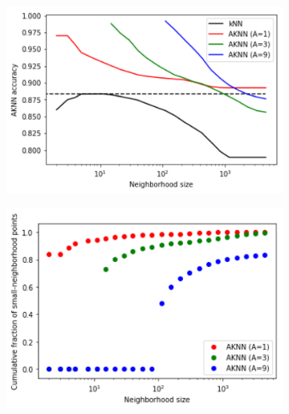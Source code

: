 \documentclass{article}
\begin{document}
\begin{figure}
    \begin{subfigure}[t]{0.49\textwidth}
    \centering
        \includegraphics[width=\linewidth]{figs/notMNIST/notMNIST_aknnvsknn.png} 
    \end{subfigure}
    \begin{subfigure}[t]{0.49\textwidth}
        \centering
        \includegraphics[width=\linewidth]{figs/notMNIST/notMNIST_aknnfrac.png} 
    \end{subfigure}
  \centering

\end{figure}
\end{document}
